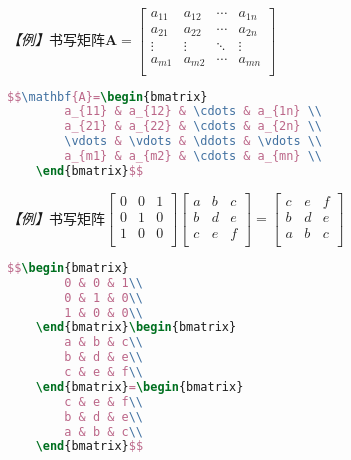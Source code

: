 \emph{【例】}书写矩阵$\mathbf{A}=\begin{bmatrix}
        a_{11} & a_{12} & \cdots & a_{1n} \\
        a_{21} & a_{22} & \cdots & a_{2n} \\
        \vdots & \vdots & \ddots & \vdots \\
        a_{m1} & a_{m2} & \cdots & a_{mn} \\
    \end{bmatrix}$
\begin{lstlisting}[language=TeX]
    $$\mathbf{A}=\begin{bmatrix}
        a_{11} & a_{12} & \cdots & a_{1n} \\
        a_{21} & a_{22} & \cdots & a_{2n} \\
        \vdots & \vdots & \ddots & \vdots \\
        a_{m1} & a_{m2} & \cdots & a_{mn} \\
    \end{bmatrix}$$
\end{lstlisting}

\emph{【例】}书写矩阵$\begin{bmatrix}
        0 & 0 & 1 \\
        0 & 1 & 0 \\
        1 & 0 & 0 \\
    \end{bmatrix}\begin{bmatrix}
        a & b & c \\
        b & d & e \\
        c & e & f \\
    \end{bmatrix}=\begin{bmatrix}
        c & e & f \\
        b & d & e \\
        a & b & c \\
    \end{bmatrix}$
\begin{lstlisting}[language=TeX]
    $$\begin{bmatrix}
        0 & 0 & 1\\
        0 & 1 & 0\\
        1 & 0 & 0\\
    \end{bmatrix}\begin{bmatrix}
        a & b & c\\
        b & d & e\\
        c & e & f\\
    \end{bmatrix}=\begin{bmatrix}
        c & e & f\\
        b & d & e\\
        a & b & c\\
    \end{bmatrix}$$
\end{lstlisting}

